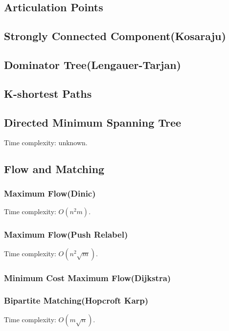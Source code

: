 \documentclass{article}
\begin{document}
    \subsection{Articulation Points}
        
    \subsection{Strongly Connected Component(Kosaraju)}
        
    \subsection{Dominator Tree(Lengauer-Tarjan)}
        
    \subsection{K-shortest Paths}
        
    \subsection{Directed Minimum Spanning Tree}
        Time complexity: unknown.
        
    \subsection{Flow and Matching}
        \subsubsection{Maximum Flow(Dinic)}
            Time complexity: $O(n^2m)$.
            
        \subsubsection{Maximum Flow(Push Relabel)}
            Time complexity: $O(n^2\sqrt m)$.
            
        \subsubsection{Minimum Cost Maximum Flow(Dijkstra)}
            
        \subsubsection{Bipartite Matching(Hopcroft Karp)}
            Time complexity: $O(m\sqrt n)$.
            
\end{document}

